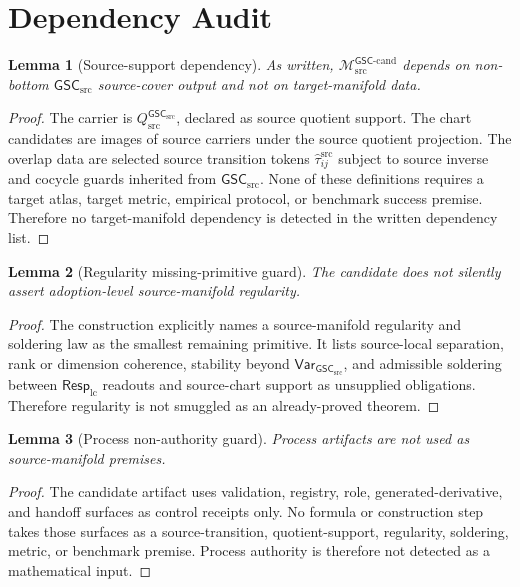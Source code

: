\documentclass[11pt]{article}
\newcommand{\RespLC}{\mathsf{Resp}_{\mathrm{lc}}}
\newcommand{\Mgsccand}{\mathcal{M}_{\mathrm{src}}^{\mathsf{GSC}\text{-}\mathrm{cand}}}
\newcommand{\GSC}{\mathsf{GSC}_{\mathrm{src}}}
\newcommand{\Vargsc}{\mathsf{Var}_{\GSC}}
\newcommand{\Qsrc}{Q_{\mathrm{src}}^{\GSC}}
\newcommand{\Tau}{\widehat{\tau}^{\mathrm{src}}}
\newtheorem{lemma}{Lemma}
\begin{document}
\section{Dependency Audit}

\begin{lemma}[Source-support dependency]
As written, \(\Mgsccand\) depends on non-bottom \(\GSC\) source-cover output
and not on target-manifold data.
\end{lemma}

\begin{proof}
The carrier is \(\Qsrc\), declared as source quotient support. The chart
candidates are images of source carriers under the source quotient projection.
The overlap data are selected source transition tokens \(\Tau_{ij}\) subject
to source inverse and cocycle guards inherited from \(\GSC\). None of these
definitions requires a target atlas, target metric, empirical protocol, or
benchmark success premise. Therefore no target-manifold dependency is
detected in the written dependency list.
\end{proof}

\begin{lemma}[Regularity missing-primitive guard]
The candidate does not silently assert adoption-level source-manifold
regularity.
\end{lemma}

\begin{proof}
The construction explicitly names a source-manifold regularity and soldering
law as the smallest remaining primitive. It lists source-local separation,
rank or dimension coherence, stability beyond \(\Vargsc\), and admissible
soldering between \(\RespLC\) readouts and source-chart support as unsupplied
obligations. Therefore regularity is not smuggled as an already-proved
theorem.
\end{proof}

\begin{lemma}[Process non-authority guard]
Process artifacts are not used as source-manifold premises.
\end{lemma}

\begin{proof}
The candidate artifact uses validation, registry, role, generated-derivative,
and handoff surfaces as control receipts only. No formula or construction
step takes those surfaces as a source-transition, quotient-support,
regularity, soldering, metric, or benchmark premise. Process authority is
therefore not detected as a mathematical input.
\end{proof}
\end{document}
